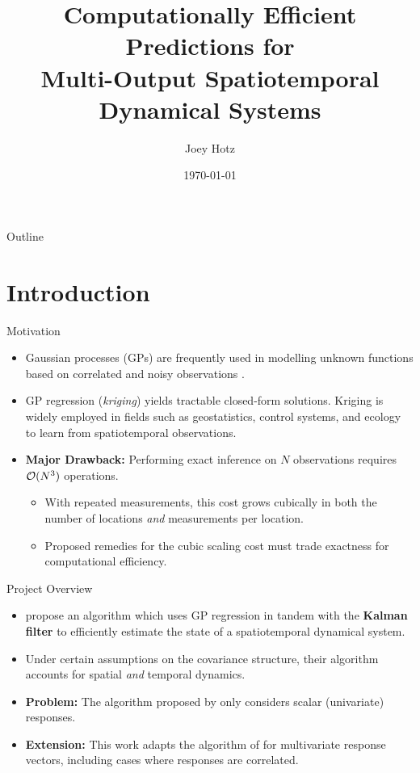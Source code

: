 \documentclass[dvipsnames, 11pt]{beamer}
\title{Computationally Efficient Predictions for\\Multi-Output Spatiotemporal Dynamical Systems}
\author{Joey Hotz}
\institute{
    Department of Statistical Sciences, University of Toronto\\
}
\date{\today}
\begin{document}
\begin{frame}
    \titlepage
\end{frame}

\begin{frame}{Outline}
    \tableofcontents
\end{frame}

\section{Introduction}

\begin{frame}{Motivation}
    \begin{itemize}
        \item 
        Gaussian processes (GPs) are frequently used in modelling unknown functions based on correlated and noisy observations \citep{GPML-Book-2006}. 
        \item 
        GP regression (\emph{kriging}) yields tractable closed-form solutions. Kriging is widely employed in fields such as geostatistics, control systems, and ecology to learn from spatiotemporal observations.
        \item 
        \textbf{Major Drawback:} Performing exact inference on $N$ observations requires $\mathcal{O}(N^3)$ operations.
        \begin{itemize}
            \item With repeated measurements, this cost grows cubically in both the number of locations \emph{and} measurements per location.
            \item Proposed remedies for the cubic scaling cost must trade exactness for computational efficiency.
        \end{itemize}
    \end{itemize}
\end{frame}

\begin{frame}{Project Overview}
    \begin{itemize}
        \item 
        \citet{Todescato-Efficient-2020} propose an algorithm which uses GP regression in tandem with the \textbf{Kalman filter} to efficiently estimate the state of a spatiotemporal dynamical system.
        \item 
        Under certain assumptions on the covariance structure, their algorithm accounts for spatial \emph{and} temporal dynamics.
        \item 
        \textbf{Problem:} The algorithm proposed by \citeauthor{Todescato-Efficient-2020} only considers scalar (univariate) responses.
        \item
        \textbf{Extension:} This work adapts the algorithm of \citeauthor{Todescato-Efficient-2020} for multivariate response vectors, including cases where responses are correlated.
    \end{itemize}
\end{frame}
\end{document}
